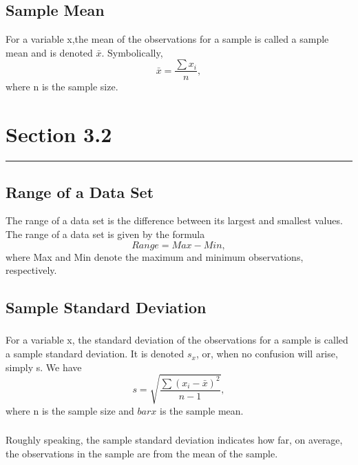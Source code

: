 \documentclass[12pt]{article}
\begin{document}
        \subsection*{Sample Mean}
                For a variable x,the mean of the observations for a sample is called a
                sample mean and is denoted \(\bar{x}\). Symbolically,
                \begin{equation}
                    \bar{x} = \frac{\sum{x_i}}{n},
                \end{equation}
                where n is the sample size.
    \section*{Section 3.2}
    \noindent\rule{\textwidth}{0.4pt}
        \subsection*{Range of a Data Set}
            The range of a data set is the difference between its largest and smallest values.
            The range of a data set is given by the formula
            \begin{equation}
                Range = Max - Min,
            \end{equation}
            where Max and Min denote the maximum and minimum observations, respectively.
        \subsection*{Sample Standard Deviation}
            \subsubsection*{}
                For a variable x, the standard deviation of the observations for a sample is called
                a sample standard deviation. It is denoted \(s_x\), or, when no confusion will arise,
                simply s.
                We have
                \begin{equation}
                    s = \sqrt{\frac{\sum{(x_i-\bar{x})^2}}{n-1}},                
                \end{equation}
                where n is the sample size and \(bar{x}\) is the sample mean.
            \subsubsection*{}
                Roughly speaking, the sample standard deviation indicates how far, on average, the
                observations in the sample are from the mean of the sample.
\end{document}
